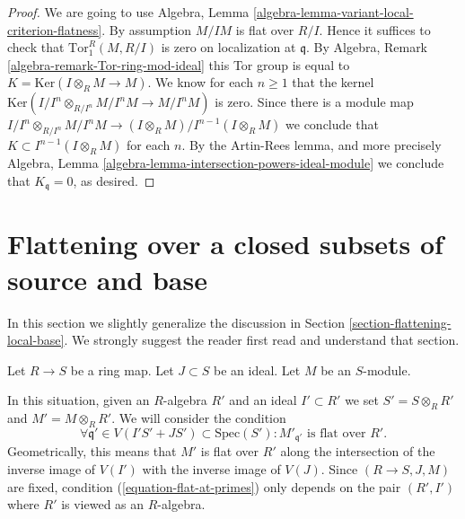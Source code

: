 \begin{proof}
We are going to use
Algebra, Lemma \ref{algebra-lemma-variant-local-criterion-flatness}.
By assumption $M/IM$ is flat over $R/I$. Hence it suffices to check
that $\text{Tor}_1^R(M, R/I)$ is zero on localization at $\mathfrak q$. By
Algebra, Remark \ref{algebra-remark-Tor-ring-mod-ideal}
this Tor group is equal to $K = \text{Ker}(I \otimes_R M \to M)$.
We know for each $n \geq 1$ that the kernel
$\text{Ker}(I/I^n \otimes_{R/I^n} M/I^nM \to M/I^nM)$ is zero.
Since there is a module map
$I/I^n \otimes_{R/I^n} M/I^nM \to (I \otimes_R M)/I^{n - 1}(I \otimes_R M)$
we conclude that $K \subset I^{n - 1}(I \otimes_R M)$ for each $n$.
By the Artin-Rees lemma, and more precisely
Algebra, Lemma \ref{algebra-lemma-intersection-powers-ideal-module}
we conclude that $K_{\mathfrak q} = 0$, as desired.
\end{proof}









\section{Flattening over a closed subsets of source and base}
\label{section-flattening-local-source-base}

\noindent
In this section we slightly generalize the discussion in
Section \ref{section-flattening-local-base}.
We strongly suggest the reader first read and understand
that section.

\begin{situation}
\label{situation-flattening-general}
Let $R \to S$ be a ring map. Let $J \subset S$ be an ideal.
Let $M$ be an $S$-module.
\end{situation}

\noindent
In this situation, given an $R$-algebra $R'$ and an ideal $I' \subset R'$
we set $S' = S \otimes_R R'$ and $M' = M \otimes_R R'$.
We will consider the condition
\begin{equation}
\label{equation-flat-at-primes}
\forall \mathfrak q' \in V(I'S' + JS') \subset \text{Spec}(S') :
M'_{\mathfrak q'}\text{ is flat over }R'.
\end{equation}
Geometrically, this means that $M'$ is flat over $R'$ along the intersection
of the inverse image of $V(I')$ with the inverse image of $V(J)$.
Since $(R \to S, J, M)$ are fixed, condition (\ref{equation-flat-at-primes})
only depends on the pair $(R', I')$ where $R'$ is viewed as an $R$-algebra.

